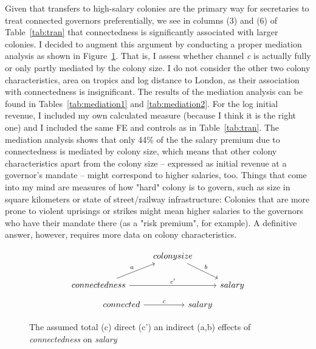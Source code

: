 \documentclass[a4paper]{article}\usepackage[]{graphicx}\usepackage[]{color}
\begin{document}
\hspace*{5mm} Given that transfers to high-salary colonies are the primary way for secretaries to treat connected governors preferentially, we see in columns (3) and (6) of Table~\ref{tab:tran} that connectedness is significantly associated with larger colonies. I decided to augment this argument by conducting a proper mediation analysis as shown in Figure~\ref{triangle}. That is, I assess whether channel \textit{c} is actually fully or only partly mediated by the colony size. I do not consider the other two colony characteristics, area on tropics and log distance to London, as their association with connectedness is insignificant. The results of the mediation analysis can be found in Tables~\ref{tab:mediation1} and \ref{tab:mediation2}. For the log initial revenue, I included my own calculated measure (because I think it is the right one) and I included the same FE and controls as in Table~\ref{tab:tran}. The mediation analysis shows that only 44\% of the the salary premium due to connectedness is mediated by colony size, which means that other colony characteristics apart from the colony size -- expressed as initial revenue at a governor's mandate -- might correspond to higher salaries, too. Things that come into my mind are measures of how "hard" colony is to govern, such as size in square kilometers or state of street/railway infrastructure: Colonies that are more prone to violent uprisings or strikes might mean higher salaries to the governors who have their mandate there (as a "risk premium", for example). A definitive answer, however, requires more data on colony characteristics.    

\begin{figure}[H]
\[
\begin{tikzcd}
 & colony size \arrow[dr,"b"] \\
connectedness \arrow[ur,"a"] \arrow[rr,"c'"] && salary
\end{tikzcd}
\]
\[
\begin{tikzcd}[row sep=2.5em]
connected \arrow[rr,"c"] && salary
\end{tikzcd}
\]
\caption{The assumed total (c) direct (c') an indirect (a,b) effects of \textit{connectedness} on \textit{salary}}
\label{triangle}
\end{figure}
\end{document}
